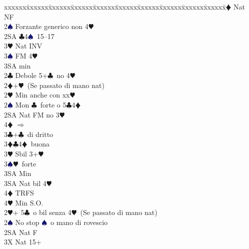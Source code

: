 \documentclass[a4paper,italian]{article}
\newcommand{\BC}{\textcolor{OliveGreen}{$\clubsuit$}}
\newcommand{\BD}{\textcolor{RedOrange}{$\vardiamondsuit$}}
\newcommand{\BH}{\textcolor{Red2}{$\varheartsuit${}}}
\newcommand{\BS}{\textcolor{MidnightBlue}{$\spadesuit${}}}
\newenvironment{bidtable}
{\begin{tabbing}

    xxxxxx\=xxxxxx\=xxxxxx\=xxxxxx\=xxxxxx\=xxxxxx\=xxxxxx\=xxxxxx\=xxxxxx\=xxxxxx\=\kill}
{\end{tabbing} }%
\begin{document}
\begin{multicols}{2}
\begin{bidtable}
                                            2\BD \> Nat NF\\
                                            2\BS \> Forzante generico non 4\BH \\
                                            2SA \BC 4\BS\ 15--17\\
                                            3\BH \> Nat INV\\
                                            3\BS \> FM 4\BH \+\\
                                            3SA \> min\-\-\\
                                            2\BC \> Debole 5+\BC\ no 4\BH \\
                                            2\BD {}+\BH\ (Se passato di mano nat)\+\\
                                            2\BH \> Min anche con xx\BH \\
                                            2\BS \> Mon \BC\ forte o 5\BC 4\BD \\
                                            2SA \> Nat FM no 3\BH \+\\
                                            4\BD \> $\Rightarrow$\-\\
                                            3\BC {}+\BC\ di dritto\\
                                            3\BD {}\BC 4\BD\ buona\\
                                            3\BH \> Sbil 3+\BH \\
                                            3\BS {}\BH\ forte\+\\
                                            3SA \> Min\-\\
                                            3SA \> Nat bil 4\BH \+\\
                                            4\BD \> TRFS\-\\
                                            4\BH \> Min S.O.\-\\
                                            2\BH {}+ 5\BC\ o bil senza 4\BH\ (Se passato di mano nat)\+\\
                                            2\BS \> No stop \BS\ o mano di rovescio\+\\
                                            2SA \> Nat F\+\\
                                            3X \> Nat 15+\\

\end{bidtable}
\end{multicols}
\end{document}
